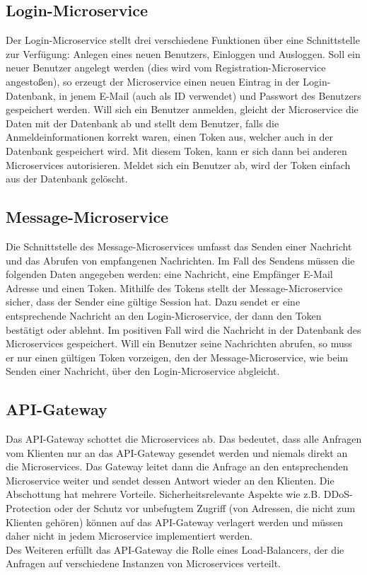 \subsection{Login-Microservice}
Der Login-Microservice stellt drei verschiedene Funktionen über eine Schnittstelle zur Verfügung: Anlegen eines neuen Benutzers, Einloggen und Ausloggen. Soll ein neuer Benutzer angelegt werden (dies wird vom Registration-Microservice angestoßen), so erzeugt der Microservice einen neuen Eintrag in der Login-Datenbank, in jenem E-Mail (auch als ID verwendet) und Passwort des Benutzers gespeichert werden. Will sich ein Benutzer anmelden, gleicht der Microservice die Daten mit der Datenbank ab und stellt dem Benutzer, falls die Anmeldeinformationen korrekt waren, einen Token aus, welcher auch in der Datenbank gespeichert wird. Mit diesem Token, kann er sich dann bei anderen Microservices autorisieren. Meldet sich ein Benutzer ab, wird der Token einfach aus der Datenbank gelöscht.

\subsection{Message-Microservice}
Die Schnittstelle des Message-Microservices umfasst das Senden einer Nachricht und das Abrufen von empfangenen Nachrichten. Im Fall des Sendens müssen die folgenden Daten angegeben werden: eine Nachricht, eine Empfänger E-Mail Adresse und einen Token. Mithilfe des Tokens stellt der Message-Microservice sicher, dass der Sender eine gültige Session hat. Dazu sendet er eine entsprechende Nachricht an den Login-Microservice, der dann den Token bestätigt oder ablehnt. Im positiven Fall wird die Nachricht in der Datenbank des Microservices gespeichert. Will ein Benutzer seine Nachrichten abrufen, so muss er nur einen gültigen Token vorzeigen, den der Message-Microservice, wie beim Senden einer Nachricht, über den Login-Microservice abgleicht.

\subsection{API-Gateway}
Das API-Gateway schottet die Microservices ab. Das bedeutet, dass alle Anfragen vom Klienten nur an das API-Gateway gesendet werden und niemals direkt an die Microservices. Das Gateway leitet dann die Anfrage an den entsprechenden Microservice weiter und sendet dessen Antwort wieder an den Klienten. Die Abschottung hat mehrere Vorteile. Sicherheitsrelevante Aspekte wie z.B. DDoS-Protection oder der Schutz vor unbefugtem Zugriff (von Adressen, die nicht zum Klienten gehören) können auf das API-Gateway verlagert werden und müssen daher nicht in jedem Microservice implementiert werden.\\
Des Weiteren erfüllt das API-Gateway die Rolle eines Load-Balancers, der die Anfragen auf verschiedene Instanzen von Microservices verteilt. 

